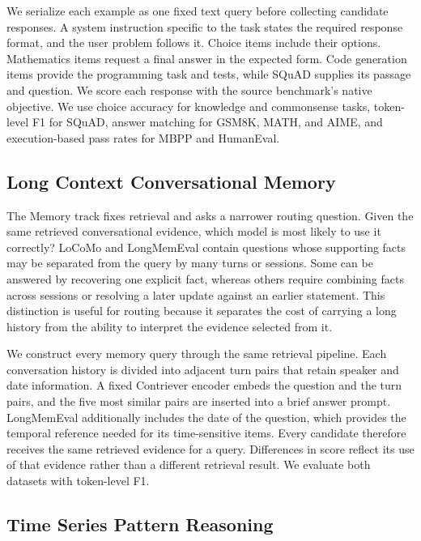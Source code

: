 We serialize each example as one fixed text query before collecting candidate responses. A system instruction specific to the task states the required response format, and the user problem follows it. Choice items include their options. Mathematics items request a final answer in the expected form. Code generation items provide the programming task and tests, while SQuAD supplies its passage and question. We score each response with the source benchmark's native objective. We use choice accuracy for knowledge and commonsense tasks, token-level F1 for SQuAD, answer matching for GSM8K, MATH, and AIME, and execution-based pass rates for MBPP and HumanEval.

\subsection{Long Context Conversational Memory} \label{app:memory}

The Memory track fixes retrieval and asks a narrower routing question. Given the same retrieved conversational evidence, which model is most likely to use it correctly? LoCoMo and LongMemEval contain questions whose supporting facts may be separated from the query by many turns or sessions. Some can be answered by recovering one explicit fact, whereas others require combining facts across sessions or resolving a later update against an earlier statement. This distinction is useful for routing because it separates the cost of carrying a long history from the ability to interpret the evidence selected from it.

We construct every memory query through the same retrieval pipeline. Each conversation history is divided into adjacent turn pairs that retain speaker and date information. A fixed Contriever \citep{izacard2022unsupervised} encoder embeds the question and the turn pairs, and the five most similar pairs are inserted into a brief answer prompt. LongMemEval additionally includes the date of the question, which provides the temporal reference needed for its time-sensitive items. Every candidate therefore receives the same retrieved evidence for a query. Differences in score reflect its use of that evidence rather than a different retrieval result. We evaluate both datasets with token-level F1.

\subsection{Time Series Pattern Reasoning} \label{app:timeseries}

